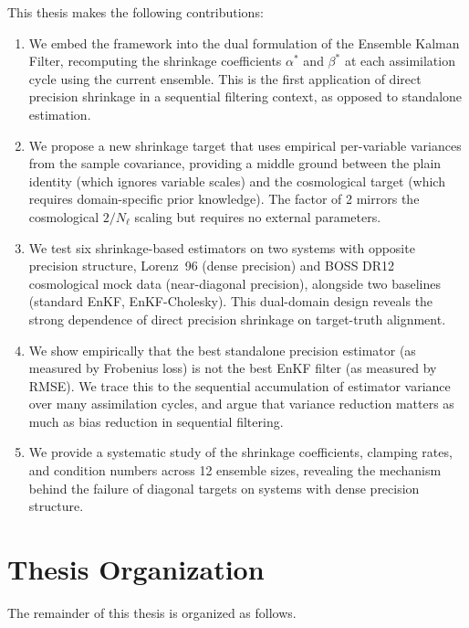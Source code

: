 This thesis makes the following contributions:

\begin{enumerate}
\item We embed the \citep{bodnar2016direct} framework into the dual formulation of the Ensemble Kalman Filter, recomputing the shrinkage coefficients $\alpha^*$ and $\beta^*$ at each assimilation cycle using the current ensemble. This is the first application of direct precision shrinkage in a sequential filtering context, as opposed to standalone estimation.

\item We propose a new shrinkage target that uses empirical per-variable variances from the sample covariance, providing a middle ground between the plain identity (which ignores variable scales) and the cosmological target (which requires domain-specific prior knowledge). The factor of 2 mirrors the cosmological $2/N_\ell$ scaling but requires no external parameters.

\item We test six shrinkage-based estimators on two systems with opposite precision structure, Lorenz~96 (dense precision) and BOSS DR12 cosmological mock data (near-diagonal precision), alongside two baselines (standard EnKF, EnKF-Cholesky). This dual-domain design reveals the strong dependence of direct precision shrinkage on target-truth alignment.

\item We show empirically that the best standalone precision estimator (as measured by Frobenius loss) is not the best EnKF filter (as measured by RMSE). We trace this to the sequential accumulation of estimator variance over many assimilation cycles, and argue that variance reduction matters as much as bias reduction in sequential filtering.

\item We provide a systematic study of the shrinkage coefficients, clamping rates, and condition numbers across 12 ensemble sizes, revealing the mechanism behind the failure of diagonal targets on systems with dense precision structure.
\end{enumerate}

\section{Thesis Organization}
\label{sec:organization}

The remainder of this thesis is organized as follows.

